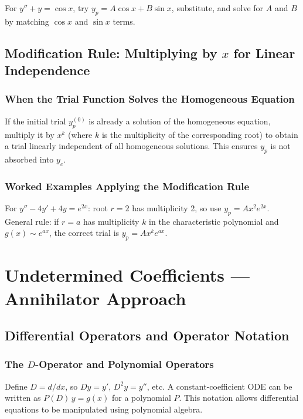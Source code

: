 \documentclass[10pt]{article}
\newcommand{\m}[1]{$#1$}
\newcommand{\annotspace}[1][3.5cm]{\vspace{#1}}
\begin{document}
    For \m{y'' + y = \cos x}, try \m{y_p = A\cos x + B\sin x}, substitute, and solve for \m{A} and
    \m{B} by matching \m{\cos x} and \m{\sin x} terms.

    \annotspace[5cm]

\subsection{Modification Rule: Multiplying by \(x\) for Linear Independence}

    \subsubsection{When the Trial Function Solves the Homogeneous Equation}
    If the initial trial \m{y_p^{(0)}} is already a solution of the homogeneous equation, multiply it
    by \m{x^k} (where \m{k} is the multiplicity of the corresponding root) to obtain a trial linearly
    independent of all homogeneous solutions. This ensures \m{y_p} is not absorbed into \m{y_c}.

    \subsubsection{Worked Examples Applying the Modification Rule}

    For \m{y'' - 4y' + 4y = e^{2x}}: root \m{r = 2} has multiplicity 2, so use
    \m{y_p = Ax^2 e^{2x}}.\\[4pt]
    General rule: if \m{r = a} has multiplicity \m{k} in the characteristic polynomial and
    \m{g(x) \sim e^{ax}}, the correct trial is \m{y_p = A x^k e^{ax}}.

    \annotspace[5cm]

\section{Undetermined Coefficients --- Annihilator Approach}

\subsection{Differential Operators and Operator Notation}

    \subsubsection{The \(D\)-Operator and Polynomial Operators}
    Define \m{D = d/dx}, so \m{Dy = y'}, \m{D^2 y = y''}, etc. A constant-coefficient ODE can be
    written as \m{P(D)\,y = g(x)} for a polynomial \m{P}. This notation allows differential equations
    to be manipulated using polynomial algebra.
\end{document}
